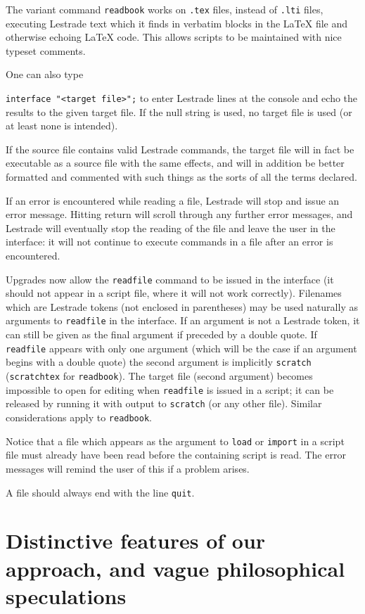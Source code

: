 \documentclass[12pt]{article}
\begin{document}
The variant command {\tt readbook} works on {\tt .tex} files, instead of {\tt .lti} files, executing Lestrade text which it finds in verbatim blocks in the LaTeX file and otherwise echoing LaTeX code.  This allows scripts to be maintained with nice typeset comments.

One can also type 

{\tt interface "<target file>";} to enter Lestrade lines at the console and echo the results to the given target file.  If the null string is used, no target file is used (or at least none is intended).

If the source
file contains valid Lestrade commands, the target file will in fact be executable as a source file with the same effects, and will in addition be better formatted and commented
with such things as the sorts of all the terms declared.

If an error is encountered while reading a file, Lestrade will stop and issue an error message.  Hitting return will scroll through any further error messages, and Lestrade will eventually stop the reading of the file and leave the user  in the interface:  it will not continue to execute commands in a file after an error is encountered.

Upgrades now allow the {\tt readfile} command to be issued in the interface (it should not appear in a script file, where it will not work correctly).  Filenames which are Lestrade
tokens (not enclosed in parentheses) may be used naturally as arguments to {\tt readfile} in the interface.  If an argument is not a Lestrade token, it can still be given as the final
argument if preceded by a double quote.  If {\tt readfile} appears with only one argument (which will be the case if an argument begins with a double quote) the second argument is
implicitly {\tt scratch}  ({\tt scratchtex} for {\tt readbook}).  The target file (second argument) becomes impossible to open for editing when {\tt readfile} is issued in a script; it can be released by running it with output to
{\tt scratch} (or any other file).  Similar considerations apply to {\tt readbook}.

Notice that a file which appears as the argument to {\tt load} or {\tt import} in a script file must already have been read before the containing script is read.  The error messages
will remind the user of this if a problem arises.

A file should always end with the line {\tt quit}.

\newpage

\section{Distinctive features of our approach, and vague philosophical speculations}
\end{document}
